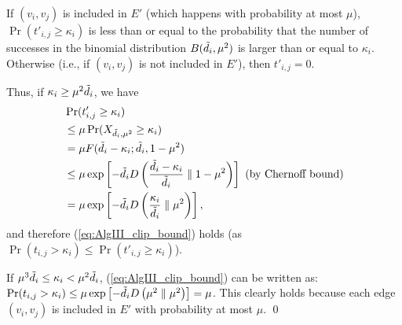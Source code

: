 {If $(v_i,v_j)$ is included in $E'$ (which happens with probability at most $\mu$), $\Pr(t'_{i,j} \geq \kappa_i)$ is less than or equal to the probability that the number of successes in the binomial distribution $B(\tilde{d}_i, \mu^2)$ is larger than or equal to $\kappa_i$.
Otherwise (i.e., if $(v_i,v_j)$ is not included in $E'$), then $t'_{i,j} = 0$.

Thus, if $\kappa_i \geq \mu^2 \tilde{d}_i$, we have
\begin{align*}
    &\Pr(t'_{i,j} \geq \kappa_i) \\
    &\leq \mu \Pr(X_{\tilde{d}_i, \mu^2} \geq \kappa_i) \\
    &= \mu F(\tilde{d}_i - \kappa_i; \tilde{d}_i, 1-\mu^2) \\
    &\leq \mu \exp \left[-\tilde{d}_i D \left(\frac{\tilde{d}_i - \kappa_i}{\tilde{d}_i} \parallel 1-\mu^2 \right) \right]  ~ \text{(by Chernoff bound)}\\
    &= \mu \exp \left[-\tilde{d}_i D \left(\frac{\kappa_i}{\tilde{d}_i} \parallel \mu^2 \right) \right],
\end{align*}
and therefore (\ref{eq:AlgIII_clip_bound}) holds (as $\Pr(t_{i,j} > \kappa_i) \leq \Pr(t'_{i,j} \geq \kappa_i)$).


If $\mu^3 \tilde{d}_i \leq \kappa_i < \mu^2 \tilde{d}_i$, (\ref{eq:AlgIII_clip_bound}) can be written as: $\Pr(t_{i,j} > \kappa_i) \leq \mu \exp \left[-\tilde{d}_i D \left(\mu^2 \parallel \mu^2 \right) \right] = \mu$.
This clearly holds because each edge $(v_i,v_j)$ is included in $E'$ with probability at most $\mu$.
\qed
}
